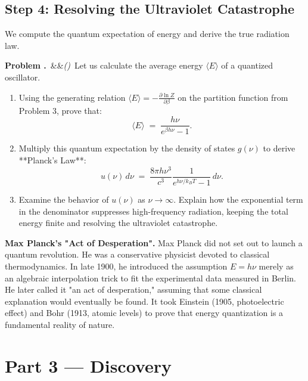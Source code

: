 \documentclass[12pt, a4paper, twoside]{book}
\newcounter{problem}[chapter]
\newcommand{\problem}[1][]{\refstepcounter{problem}\medskip\noindent
  \textcolor{accent}{\textbf{Problem \theproblem.}}\ \ifx&#1&\else\textit{(#1)}\ \fi}
\begin{document}
\subsection{Step 4: Resolving the Ultraviolet Catastrophe}

We compute the quantum expectation of energy and derive the true radiation law.

\begin{explobox}
\problem Let us calculate the average energy $\langle E \rangle$ of a quantized oscillator.
\begin{enumerate}[label=(\alph*), topsep=2pt]
  \item Using the generating relation $\langle E \rangle = -\frac{\partial \ln Z}{\partial \beta}$ on the partition function from Problem 3, prove that:
  \[
    \langle E \rangle \;=\; \frac{h\nu}{e^{\beta h\nu} - 1}.
  \]
  \item Multiply this quantum expectation by the density of states $g(\nu)$ to derive **Planck's Law**:
  \[
    u(\nu) \, d\nu \;=\; \frac{8\pi h \nu^3}{c^3} \frac{1}{e^{h\nu/k_B T} - 1} \, d\nu.
  \]
  \item Examine the behavior of $u(\nu)$ as $\nu \to \infty$. Explain how the exponential term in the denominator suppresses high-frequency radiation, keeping the total energy finite and resolving the ultraviolet catastrophe.
\end{enumerate}
\end{explobox}

\begin{historybox}
\textbf{Max Planck's "Act of Desperation".}
Max Planck did not set out to launch a quantum revolution. He was a conservative physicist devoted to classical thermodynamics. In late 1900, he introduced the assumption $E = h\nu$ merely as an algebraic interpolation trick to fit the experimental data measured in Berlin. He later called it "an act of desperation," assuming that some classical explanation would eventually be found. It took Einstein (1905, photoelectric effect) and Bohr (1913, atomic levels) to prove that energy quantization is a fundamental reality of nature.
\end{historybox}

\newpage

\section{Part 3 --- Discovery}
\end{document}
